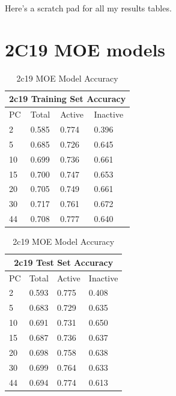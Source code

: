 Here's a scratch pad for all my results tables.

\section{2C19 MOE models}

\begin{table}[!h]
\begin{minipage}{.5\linewidth}
\centering
\begin{tabular}{|l|l|l|l|}
\hline
\multicolumn{4}{|c|}{2c19 Training Set Accuracy} \\ \hline
PC & Total          & Active          & Inactive \\ \hline
2  & 0.585          & 0.774           & 0.396   \\ \hline
5  & 0.685          & 0.726           & 0.645   \\ \hline
10 & 0.699          & 0.736           & 0.661    \\ \hline
15 & 0.700          & 0.747           & 0.653    \\ \hline
20 & 0.705          & 0.749           & 0.661    \\ \hline
30 & 0.717          & 0.761           & 0.672    \\ \hline
44 & 0.708          & 0.777           & 0.640    \\ \hline
\end{tabular}
\end{minipage}%
\begin{minipage}{.5\linewidth}
\centering
\begin{tabular}{|l|l|l|l|}
\hline
\multicolumn{4}{|c|}{2c19 Test Set Accuracy}       \\ \hline
PC & Total          & Active          & Inactive   \\ \hline
2  & 0.593          & 0.775           & 0.408      \\ \hline
5  & 0.683          & 0.729           & 0.635      \\ \hline
10 & 0.691          & 0.731           & 0.650      \\ \hline
15 & 0.687          & 0.736           & 0.637      \\ \hline
20 & 0.698          & 0.758           & 0.638      \\ \hline
30 & 0.699          & 0.764           & 0.633      \\ \hline
44 & 0.694          & 0.774           & 0.613      \\ \hline
\end{tabular}
\end{minipage}
\caption{2c19 MOE Model Accuracy}
\end{table}

